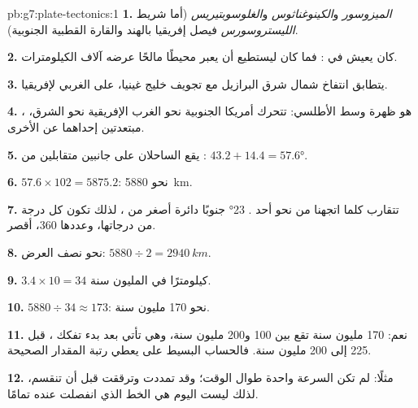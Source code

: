 \begin{solution}{pb:g7:plate-tectonics:1}
\textbf{1.} \emph{الميزوسور} و\emph{الكينوغناثوس} و\emph{الغلوسوبتيريس}
(أما شريط \emph{الليستروسورس} فيصل إفريقيا بالهند والقارة القطبية الجنوبية).

\textbf{2.} كان يعيش في : فما كان ليستطيع أن يعبر محيطًا مالحًا
عرضه آلاف الكيلومترات.

\textbf{3.} يتطابق انتفاخ شمال شرق البرازيل مع تجويف
خليج غينيا، على  الغربي لإفريقيا.

\textbf{4.} ، هو ظهرة وسط الأطلسي: تتحرك  أمريكا
الجنوبية نحو الغرب  الإفريقية نحو الشرق، مبتعدتين إحداهما عن الأخرى.

\textbf{5.} يقع الساحلان على جانبين متقابلين من :
$43.2 + 14.4 = \ang{57.6}$.

\textbf{6.} $57.6 \times 102 = 5875.2$: نحو \qty{5880}{km}.

\textbf{7.} تتقارب  كلما اتجهنا من
 نحو أحد .  \ang{23} جنوبًا دائرة أصغر
من ، لذلك تكون كل درجة من درجاتها، وعددها 360، أقصر.

\textbf{8.} نحو نصف العرض: $5880 \div 2 = \qty{2940}{km}$.

\textbf{9.} $3.4 \times 10 = 34$ كيلومترًا في المليون سنة.

\textbf{10.} $5880 \div 34 \approx 173$: نحو 170 مليون سنة.

\textbf{11.} نعم: 170 مليون سنة تقع بين 100 و200 مليون سنة،
وهي تأتي بعد بدء تفكك ، قبل 225 إلى 200 مليون
سنة. فالحساب البسيط على  يعطي رتبة
المقدار الصحيحة.

\textbf{12.} مثلًا: لم تكن السرعة واحدة طوال الوقت؛
وقد تمددت  وترققت قبل أن تنقسم، لذلك ليست  اليوم
هي الخط الذي انفصلت عنده تمامًا.
\end{solution}
